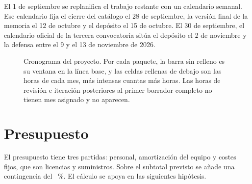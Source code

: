 El 1 de septiembre se replanifica el trabajo restante con un calendario
semanal. Ese calendario fija el cierre del catálogo el 28 de septiembre,
la versión final de la memoria el 12 de octubre y el depósito el 15 de
octubre. El 30 de septiembre, el calendario oficial de la tercera
convocatoria sitúa el depósito el 2 de noviembre y la defensa entre el 9
y el 13 de noviembre de 2026.

\begin{figure}[tbp]
\centering

\caption[Cronograma previsto y al cierre]{Cronograma del proyecto. Por cada paquete, la barra sin relleno es su ventana en la línea base, y las celdas rellenas de debajo son las horas de cada mes, más intensas cuantas más horas. Las  horas de revisión e iteración posteriores al primer borrador completo no tienen mes asignado y no aparecen.}
\label{fig:metodologia:cronograma}
\end{figure}

\section{Presupuesto}
\label{sec:metodologia:presupuesto}

El presupuesto tiene tres partidas: personal, amortización del equipo y
costes fijos, que son licencias y suministros. Sobre el subtotal previsto se añade una contingencia del
~\%. El cálculo se apoya en las siguientes
hipótesis.

